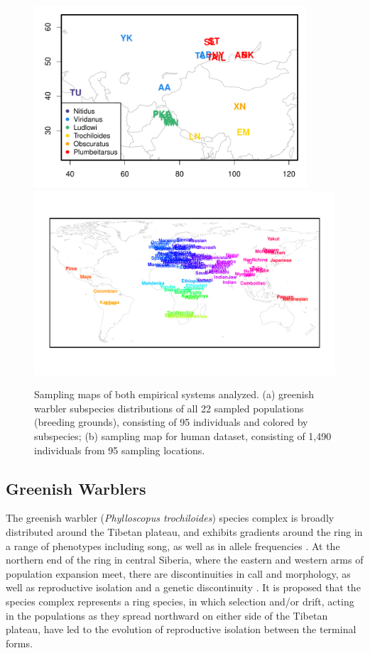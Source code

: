 \documentclass[12pt]{article}
\begin{document}
\begin{figure}
	\centering
			{\includegraphics[width=4in,height=2.67in]{figs/warblers/warbler_sampling_map.pdf}}
			{\includegraphics[width=\textwidth,height=0.6\textwidth]{figs/globetrotter/globe_world_map_text.pdf}}
            \caption{Sampling maps of both empirical systems analyzed.  (a) greenish warbler subspecies distributions of all 22 sampled populations (breeding grounds), consisting of 95 individuals and colored by subspecies; (b) sampling map for human dataset, consisting of 1,490 individuals from 95 sampling locations.}
\label{sfig:empirical_maps}
\end{figure}


\subsection*{Greenish Warblers}  

The greenish warbler (\textit{Phylloscopus trochiloides}) species complex is broadly distributed around the Tibetan plateau, and exhibits gradients around the ring in a range of phenotypes including song, as well as in allele frequencies \citep{ticehurst1938, Irwin2001, Irwin2005}.  At the northern end of the ring in central Siberia, where the eastern and western arms of population expansion meet, there are discontinuities in call and morphology, as well as reproductive isolation and a genetic discontinuity \citep{Irwin2001, Irwin2008}. It is proposed that the species complex represents a ring species, in which selection and/or drift, acting in the populations as they spread northward on either side of the Tibetan plateau, have led to the evolution of reproductive isolation between the terminal forms.
\end{document}

